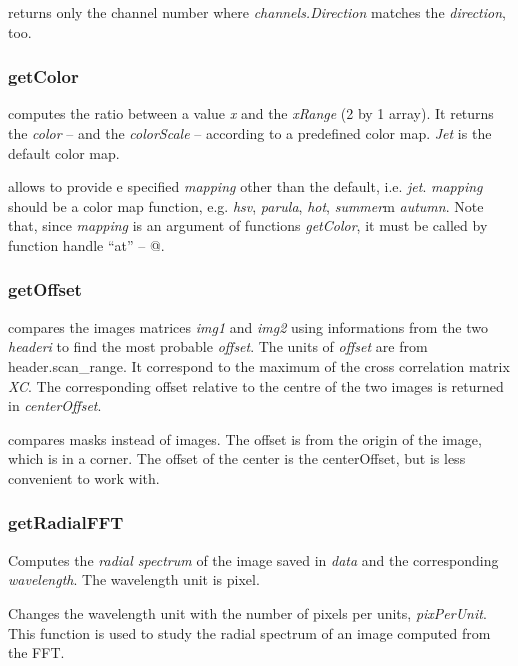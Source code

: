  returns only the channel number where \emph{channels.Direction} matches the \emph{direction}, too.
\edf
\subsubsection{getColor}
\bdf
{} computes the ratio between a value \emph{x} and the \emph{xRange} (2 by 1 array). It returns the \emph{color} --  and the \emph{colorScale}  -- according to a predefined color map. \emph{Jet} is the default color map. 

 allows to provide e specified \emph{mapping} other than the default, i.e. \emph{jet}. \emph{mapping} should be a color map function, e.g. \emph{hsv}, \emph{parula}, \emph{hot}, \emph{summer}m \emph{autumn}. Note that, since \emph{mapping} is an argument of functions \emph{getColor}, it must be called by function handle ``at'' -- @.
\edf
\subsubsection{getOffset}
\bdf
{} compares the images matrices \emph{img1} and \emph{img2} using informations from the two \emph{headeri} to find the most probable \emph{offset}. The units of \emph{offset} are from header.scan\_range. It correspond to the maximum of the cross correlation matrix \emph{XC}. The corresponding offset relative to the centre of the two images is returned in \emph{centerOffset}.

 compares masks instead of images.
\edf
The offset is from the origin of the image, which is in a corner. The offset of the center is the centerOffset, but is less convenient to work with.
\subsubsection{getRadialFFT}
\bdf
{} Computes the \emph{radial spectrum} of the image saved in \emph{data} and the corresponding \emph{wavelength}. The wavelength unit is pixel.

 Changes the wavelength unit with the number of pixels per units, \emph{pixPerUnit}.
\edf
This function is used to study the radial spectrum of an image computed from the FFT.
